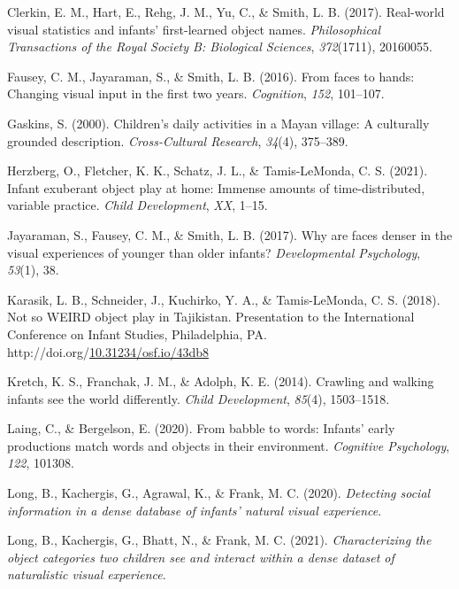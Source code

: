 \documentclass[10pt, letterpaper]{article}
\newenvironment{CSLReferences}%
  {}%
  {\par}
\begin{document}
\begin{CSLReferences}{1}{0}
\leavevmode\hypertarget{ref-clerkin2017real}{}%
Clerkin, E. M., Hart, E., Rehg, J. M., Yu, C., \& Smith, L. B. (2017).
Real-world visual statistics and infants' first-learned object names.
\emph{Philosophical Transactions of the Royal Society B: Biological
Sciences}, \emph{372}(1711), 20160055.

\leavevmode\hypertarget{ref-fausey2016faces}{}%
Fausey, C. M., Jayaraman, S., \& Smith, L. B. (2016). From faces to
hands: Changing visual input in the first two years. \emph{Cognition},
\emph{152}, 101--107.

\leavevmode\hypertarget{ref-gaskins2000childrens}{}%
Gaskins, S. (2000). Children's daily activities in a {M}ayan village: A
culturally grounded description. \emph{Cross-Cultural Research},
\emph{34}(4), 375--389.

\leavevmode\hypertarget{ref-herzberg2021exuberant}{}%
Herzberg, O., Fletcher, K. K., Schatz, J. L., \& Tamis-LeMonda, C. S.
(2021). Infant exuberant object play at home: Immense amounts of
time-distributed, variable practice. \emph{Child Development},
\emph{XX}, 1--15.

\leavevmode\hypertarget{ref-jayaraman2017faces}{}%
Jayaraman, S., Fausey, C. M., \& Smith, L. B. (2017). Why are faces
denser in the visual experiences of younger than older infants?
\emph{Developmental Psychology}, \emph{53}(1), 38.

\leavevmode\hypertarget{ref-karasik2018not}{}%
Karasik, L. B., Schneider, J., Kuchirko, Y. A., \& Tamis-LeMonda, C. S.
(2018). Not so {WEIRD} object play in {T}ajikistan. Presentation to the
International Conference on Infant Studies, Philadelphia, PA.
http://doi.org/\href{https://doi.org/10.31234/osf.io/43db8}{10.31234/osf.io/43db8}

\leavevmode\hypertarget{ref-kretch2014crawling}{}%
Kretch, K. S., Franchak, J. M., \& Adolph, K. E. (2014). Crawling and
walking infants see the world differently. \emph{Child Development},
\emph{85}(4), 1503--1518.

\leavevmode\hypertarget{ref-laing2020babble}{}%
Laing, C., \& Bergelson, E. (2020). From babble to words: Infants' early
productions match words and objects in their environment.
\emph{Cognitive Psychology}, \emph{122}, 101308.

\leavevmode\hypertarget{ref-long2020detecting}{}%
Long, B., Kachergis, G., Agrawal, K., \& Frank, M. C. (2020).
\emph{Detecting social information in a dense database of infants'
natural visual experience}.

\leavevmode\hypertarget{ref-long2021characterizing}{}%
Long, B., Kachergis, G., Bhatt, N., \& Frank, M. C. (2021).
\emph{Characterizing the object categories two children see and interact
within a dense dataset of naturalistic visual experience}.


\end{CSLReferences}
\end{document}
